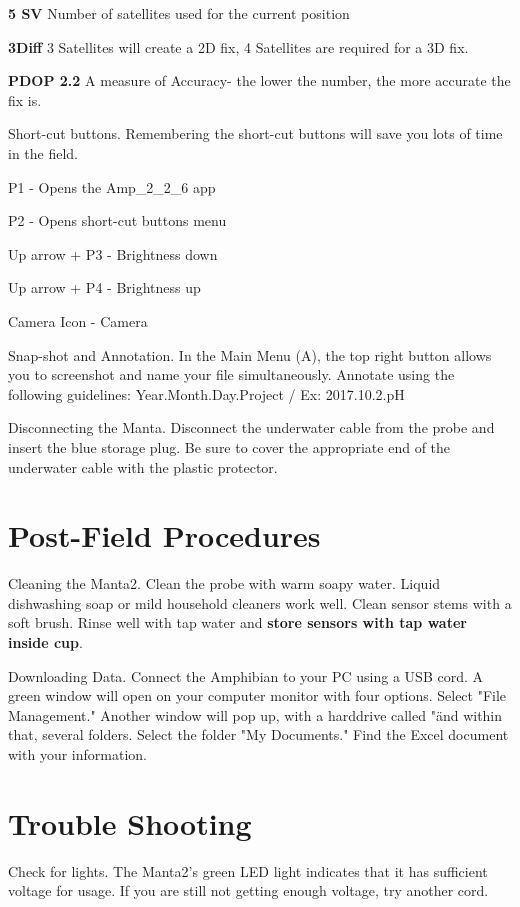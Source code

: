 \documentclass[12pt]{../SOP3_beta}\usepackage[]{graphicx}\usepackage[]{color}
\begin{document}
\textbf{5 SV} Number of satellites used for the current position

\textbf{3Diff} 3 Satellites will create a 2D fix, 4 Satellites are required for a 3D fix.

\textbf{PDOP 2.2} A measure of Accuracy- the lower the number, the more accurate the fix is.

\NP Short-cut buttons. Remembering the short-cut buttons will save you lots of time in the field. 

{P1} - Opens the Amp\_2\_2\_6 app

{P2} - Opens short-cut buttons menu

{Up arrow + P3} - Brightness down

{Up arrow + P4} - Brightness up

{Camera Icon} - Camera

\NP Snap-shot and Annotation. In the Main Menu (A), the top right button allows you to screenshot and name your file simultaneously. Annotate using the following guidelines: Year.Month.Day.Project / Ex: 2017.10.2.pH

\NP Disconnecting the Manta. Disconnect the underwater cable from the probe and insert the blue storage plug. Be sure to cover the appropriate end of the underwater cable with the plastic protector. 

\section{Post-Field Procedures}

\NP Cleaning the Manta2. Clean the probe with warm soapy water. Liquid dishwashing soap or mild household cleaners work well. Clean sensor stems with a soft brush. Rinse well with tap water and \textbf{store sensors with tap water inside cup}.

\NP Downloading Data. Connect the Amphibian to your PC using a USB cord. A green window will open on your computer monitor with four options. Select "File Management." Another window will pop up, with a harddrive called "\" and within that, several folders. Select the folder "My Documents." Find the Excel document with your information.

\section{Trouble Shooting}

\NP Check for lights. The Manta2's green LED light indicates that it has sufficient voltage for usage. If you are still not getting enough voltage, try another cord.
\end{document}
